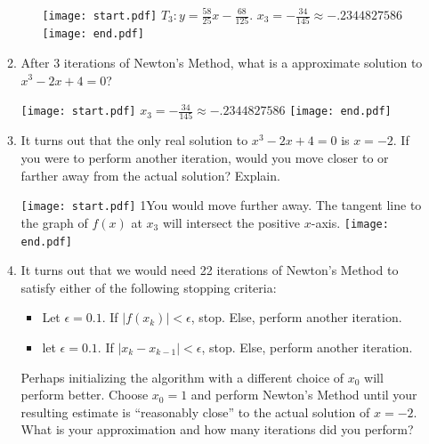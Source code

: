 \documentclass[12pt]{article}
\begin{document}
\begin{enumerate}
\begin{enumerate}
\begin{itemize}
\texttt{[image: start.pdf]}
{{$T_3: y=\frac{58}{25}x-\frac{68}{125}$. $x_3=-\frac{34}{145}\approx-.2344827586$}}
\texttt{[image: end.pdf]}


\end{itemize}

\item After 3 iterations of Newton's Method, what is a approximate solution to $x^3-2x+4=0$?

\texttt{[image: start.pdf]}
{{$x_3=-\frac{34}{145}\approx-.2344827586$}}
\texttt{[image: end.pdf]}


\item It turns out that the only real solution to $x^3-2x+4=0$ is $x=-2$.  If you were to perform another iteration, would you move closer to or farther away from the actual solution?  Explain.

\texttt{[image: start.pdf]}
{{{1\linewidth}{You would move further away.  The tangent line to the graph of $f(x)$ at $x_3$ will intersect the positive $x$-axis. }}}
\texttt{[image: end.pdf]}


\item It turns out that we would need 22 iterations of Newton's Method to satisfy either of the following stopping criteria:

\begin{itemize}

\item Let $\epsilon=0.1$. If $|f(x_k)|<\epsilon$, stop.  Else, perform another iteration.

\item  let $\epsilon=0.1$.  If $|x_k-x_{k-1}|<\epsilon$, stop.  Else, perform another iteration.

\end{itemize}

Perhaps initializing the algorithm with a different choice of $x_0$ will perform better.  Choose $x_0=1$ and perform Newton's Method until your resulting estimate is ``reasonably close'' to the actual solution of $x=-2$. What is your approximation and how many iterations did you perform?


\end{enumerate}
\end{enumerate}
\end{document}

